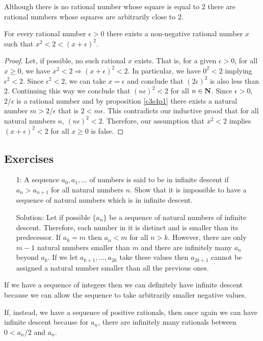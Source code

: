 Although there is no rational number whose square is equal to $2$ there 
are rational numbers whose squares are arbitrarily close to $2$.
\begin{prop}\label{c3s4p4}
For every rational number $\epsilon > 0$ there exists a non-negative 
rational number $x$ such that $x^2 < 2 < (x + \epsilon)^2$.
\end{prop}
\begin{proof}
Let, if possible, no such rational $x$ exists. That is, for a given 
$\epsilon > 0$, for all $x \ge 0$, we have $x^2 < 2 \Rightarrow 
(x + \epsilon)^2 < 2$. In particular, we have $0^2 < 2$ implying 
$\epsilon^2 < 2$. Since $\epsilon^2 < 2$, we can take $x = \epsilon$ and
conclude that $(2\epsilon)^2$ is also less than $2$. Continuing this way
we conclude that $(n\epsilon)^2 < 2$ for all $n \in \mathbf{N}$. Since $\epsilon
> 0$, $2/\epsilon$ is a rational number and by proposition \ref{c3s4p1}
there exists a natural number $m > 2/\epsilon$ that is $2 < m\epsilon$.
This contradicts our inductive prood that for all natural numbers $n$,
$(n\epsilon)^2 < 2$. Therefore, our assumption that $x^2 < 2$ implies
$(x + \epsilon)^2 < 2$ for all $x \ge 0$ is false.
\end{proof}

\subsection{Exercises}
\begin{enumerate}
\item[1:] A sequence $a_0, a_1, \ldots$ of numbers is said to be in 
infinite descent if $a_n > a_{n+1}$ for all natural numbers $n$. Show that
it is impossible to have a sequence of natural numbers which is in 
infinite descent.
\item[Solution:] Let if possible $\{a_n\}$ be a sequence of natural 
numbers of infinite descent. Therefore, each number in it is distinct and
is smaller than its predecessor. If $a_k = m$ then $a_n < m$ for all $n
> k$. However, there are only $m - 1$ natural numbers smaller than $m$
and there are infinitely many $a_n$ beyond $a_k$. If we let $a_{k+1}, 
\ldots, a_{2k}$ take these values then $a_{2k+1}$ cannot be assigned a
natural number smaller than all the previous ones.
\end{enumerate}

If we have a sequence of integers then we can definitely have infinite
descent because we can allow the sequence to take arbitrarily smaller
negative values.

If, instead, we have a sequence of positive rationals, then once again we 
can have infinite descent because for $a_n$, there are infinitely many
rationals between $0 < a_n/2$ and $a_n$.
